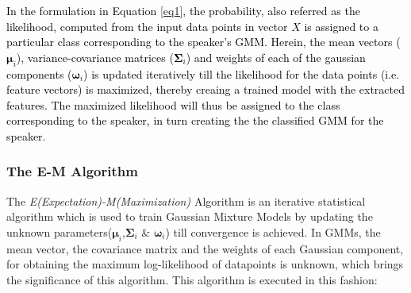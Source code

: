 \documentclass{article}
\begin{document}
\textcolor{black}{In the formulation in Equation \ref{eq1}, the probability, also referred as the likelihood, computed from the input data points in vector $X$ is assigned to a particular class corresponding to the speaker's GMM. Herein, the mean vectors ($\bm \mu_i$), variance-covariance matrices ($\bm\Sigma_i$) and weights of each of the gaussian components ($\bm \omega_i$) is updated iteratively till the likelihood for the data points (i.e. feature vectors) is maximized, %
thereby creaing a trained model with the extracted features. The maximized likelihood will thus be assigned to the class corresponding to the speaker, in turn creating the the classified GMM for the speaker.} 

\subsubsection{{The E-M Algorithm}} The \textit{E(Expectation)-M(Maximization)} Algorithm is an iterative statistical algorithm which is used to train Gaussian Mixture Models by updating the unknown parameters($\bm\mu_i$,$\bm\Sigma_i$ \& $\bm\omega_i$) till convergence is achieved. In GMMs, the mean vector, the covariance matrix and the weights of each Gaussian component, for obtaining the maximum log-likelihood of datapoints is unknown, which brings the significance of this algorithm. This algorithm is executed in this fashion:
\end{document}
